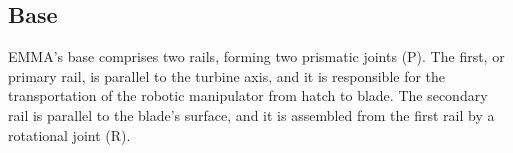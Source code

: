 % 


 

\subsection{Base}

EMMA's base comprises two rails, forming two prismatic joints (P). The
first, or primary rail, is parallel to the turbine axis, and it is responsible
for the transportation of the robotic manipulator from hatch to blade. The
secondary rail is parallel to the blade's surface, and it is assembled from the
first rail by a rotational joint (R). 

